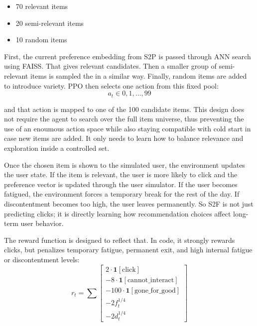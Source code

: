 \begin{itemize}
    \item 70 relevant items
    \item 20 semi-relevant items
    \item 10 random items
\end{itemize}

First, the current preference embedding from S2P is passed through ANN search using FAISS.
That gives relevant candidates.
Then a smaller group of semi-relevant items is sampled the in a similar way. 
Finally, random items are added to introduce variety. 
PPO then selects one action from this fixed pool:
\begin{equation}
    a_t \in {0,1,\dots,99}
\end{equation}

and that action is mapped to one of the 100 candidate items. 
This design does not require the agent to search over the full item universe, 
thus preventing the use of an enoumous action space while also staying compatible with cold start in case new items are added.
It only needs to learn how to balance relevance and exploration inside a controlled set.

Once the chosen item is shown to the simulated user, the environment updates the user state. 
If the item is relevant, the user is more likely to click and the preference vector is updated through the user simulator. 
If the user becomes fatigued, the environment forces a temporary break for the rest of the day. 
If discontentment becomes too high, the user leaves permanently. 
So S2F is not just predicting clicks; it is directly learning how recommendation choices affect long-term user behavior.

The reward function is designed to reflect that. 
In code, it strongly rewards clicks, but penalizes temporary fatigue, permanent exit, and high internal fatigue or discontentment levels:
\begin{equation}
    r_t = 
        \sum
        \begin{bmatrix}
            2\cdot \mathbf{1}[\text{click}] \\
            - 8\cdot \mathbf{1}[\text{cannot\_interact}] \\
            - 100\cdot \mathbf{1}[\text{gone\_for\_good}] \\
            - 2 f_t^{1/4} \\
            - 2 d_t^{1/4}
        \end{bmatrix}
\end{equation}

